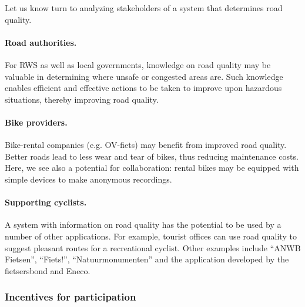 \documentclass[a4paper,11pt]{article}
\begin{document}
Let us know turn to analyzing stakeholders of a system that determines road quality.

\paragraph{Road authorities.}
For RWS as well as local governments, knowledge on road quality may be valuable in determining where unsafe or congested areas are. Such knowledge enables efficient and effective actions to be taken to improve upon hazardous situations, thereby improving road quality.

\paragraph{Bike providers.}
Bike-rental companies (e.g. OV-fiets) may benefit from improved road quality. Better roads lead to less wear and tear of bikes, thus reducing maintenance costs. Here, we see also a potential for collaboration: rental bikes may be equipped with simple devices to make anonymous recordings.

\paragraph{Supporting cyclists.}
A system with information on road quality has the potential to be used by a number of other applications. For example, tourist offices can use road quality to suggest pleasant routes for a recreational cyclist. Other examples include ``ANWB Fietsen'', ``Fiets!'', ``Natuurmonumenten'' and the application developed by the fietsersbond and Eneco.

\subsubsection{Incentives for participation}
\end{document}

